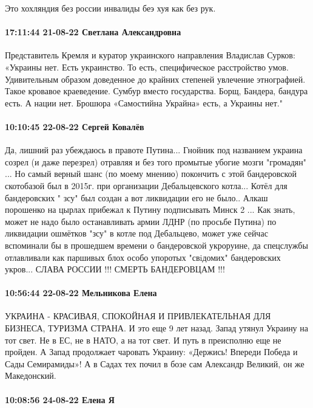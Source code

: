 Это хохляндия без россии инвалиды беэ хуя как без рук.

\paragraph{17:11:44 21-08-22 Светлана Александровна}

Представитель Кремля и куратор украинского направления Владислав Сурков:
«Украины нет. Есть украинство. То есть, специфическое расстройство умов. Удивительным образом доведенное до крайних степеней увлечение этнографией. Такое кровавое краеведение. Сумбур вместо государства. Борщ, Бандера, бандура есть. А нации нет. Брошюра «Самостийна Украйна» есть, а Украины нет."

\paragraph{10:10:45 22-08-22 Сергей Ковалёв}

Да, лишний раз убеждаюсь в правоте Путина... Гнойник под названием украина
созрел (и даже перезрел) отравляя и без того промытые убогие мозги "громадян"
... Но самый верный шанс (по моему мнению) покончить с этой бандеровской
скотобазой был в 2015г. при организации Дебальцевского котла... Котёл для
бандеровских " зсу" был создан а вот ликвидации его не было.. Алкаш порошенко
на цырлах прибежал к Путину подписывать Минск 2 ... Как знать, может не надо
было останавливать армии ЛДНР (по просьбе Путина) по ликвидации ошмётков "зсу"
в котле под Дебальцево, может уже сейчас вспоминали бы в прошедшем времени о
бандеровской укроруине, да спецслужбы отлавливали как паршивых блох особо
упоротых "свiдомих" бандеровских укров... СЛАВА РОССИИ !!! СМЕРТЬ БАНДЕРОВЦАМ
!!!

\paragraph{10:56:44 22-08-22 Мельникова Елена}

УКРАИНА - КРАСИВАЯ, СПОКОЙНАЯ И ПРИВЛЕКАТЕЛЬНАЯ ДЛЯ БИЗНЕСА, ТУРИЗМА СТРАНА.
И это еще 9 лет назад. Запад утянул Украину на тот свет. Не в ЕС, не в НАТО, а на тот свет. И путь в преисполню еще не пройден.
А Запад продолжает чаровать Украину: «Держись! Впереди Победа и Сады Семирамиды»! А в Садах тех почил в бозе сам Александр Великий, он же Македонский.

\paragraph{10:08:56 24-08-22 Елена Я}

